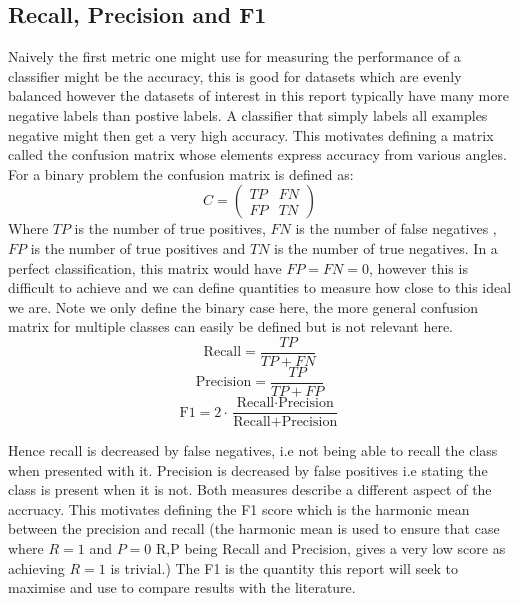   \subsection{Recall, Precision and F1}
    Naively the first metric one might use for measuring the performance of a classifier
    might be the accuracy, this is good for datasets which are evenly balanced however
    the datasets of interest in this report typically have many more negative labels than postive labels.
    A classifier that simply labels all examples negative might then get a very high accuracy. This motivates
    defining a matrix called the confusion matrix whose elements express accuracy from various angles.
    For a binary problem the confusion matrix is defined as:
    \begin{equation}
      C =
      \begin{pmatrix}
        TP & FN\\
        FP & TN
      \end{pmatrix}
    \end{equation}
    Where $TP$ is the number of true positives, $FN$ is the number of false negatives
    , $FP$ is the number of true positives and $TN$ is the number of true negatives.
    In a perfect classification, this matrix would have $FP=FN=0$, however this is
    difficult to achieve
    and we can define quantities to measure how close to this ideal we are. Note we
    only define the binary case here, the more general confusion matrix for multiple
    classes can easily be defined but is not relevant here.
    \begin{equation}
      \text{Recall} = \frac{TP}{TP+FN}
    \end{equation}
    \begin{equation}
      \text{Precision} = \frac{TP}{TP+FP}
    \end{equation}
    \begin{equation}
      \text{F1} = 2 \cdot \frac{\text{Recall} \cdot \text{Precision}}{\text{Recall} + \text{Precision}}
    \end{equation}

    Hence recall is decreased by false negatives, i.e not being able to recall the class
    when presented with it. Precision is decreased by false positives i.e stating the class
    is present when it is not. Both measures describe a different aspect of the accruacy. This
    motivates defining the F1 score which is the harmonic mean between the precision and recall
    (the harmonic mean is used to ensure that case where $R=1$ and $P=0$ R,P being Recall and Precision, gives
    a very low score  as achieving $R=1$ is trivial.) The F1 is the quantity this report will seek to maximise and use to compare
    results with the literature.
